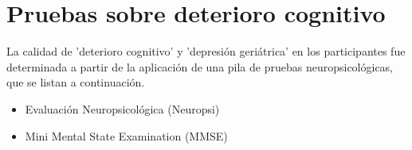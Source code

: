 \section{Pruebas sobre deterioro cognitivo}

La calidad de 'deterioro cognitivo' y 'depresi\'on geri\'atrica' en los participantes fue
determinada a partir de la aplicaci\'on de una pila de pruebas neuropsicol\'ogicas, que se
listan a continuaci\'on.

\begin{itemize}

\item {Evaluaci\'on Neuropsicol\'ogica (Neuropsi)} \cite{Solis03}

\item {Mini Mental State Examination (MMSE)} 
\cite{Velasco15}


\end{itemize}
